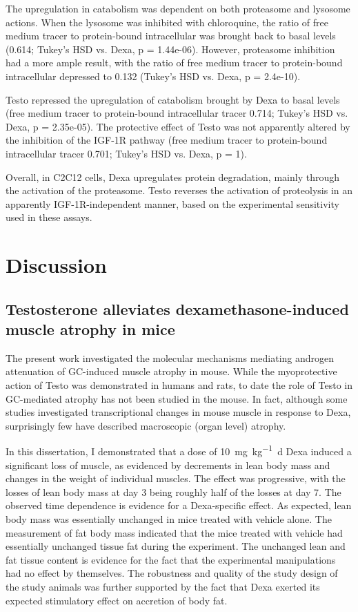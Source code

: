 \documentclass[12pt,english]{report}\usepackage[]{graphicx}\usepackage[]{color}
\begin{document}
The upregulation in catabolism was dependent on both proteasome and
lysosome actions. When the lysosome was inhibited with chloroquine,
the ratio of free medium tracer to protein-bound intracellular was
brought back to basal levels (0.614;
Tukey's HSD vs. Dexa, p = 1.44e-06).
However, proteasome inhibition had a more ample result, with the ratio
of free medium tracer to protein-bound intracellular depressed to
0.132
(Tukey's HSD vs. Dexa, p = 2.4e-10).

Testo repressed the upregulation of catabolism brought by Dexa to
basal levels (free medium tracer to protein-bound intracellular tracer
0.714;
Tukey's HSD vs. Dexa, p = 2.35e-05).
The protective effect of Testo was not apparently altered by the inhibition
of the IGF-1R pathway (free medium tracer to protein-bound intracellular
tracer 0.701;
Tukey's HSD vs. Dexa, p = 1).

Overall, in C2C12 cells, Dexa upregulates protein degradation, mainly
through the activation of the proteasome. Testo reverses the activation
of proteolysis in an apparently IGF-1R-independent manner, based on
the experimental sensitivity used in these assays.

\pagebreak{}


\chapter{Discussion}


\section{Testosterone alleviates dexamethasone-induced muscle atrophy in mice}

The present work investigated the molecular mechanisms mediating androgen
attenuation of GC-induced muscle atrophy in mouse. While the myoprotective
action of Testo was demonstrated in humans and rats, to date the role
of Testo in GC-mediated atrophy has not been studied in the mouse.
In fact, although some studies investigated transcriptional changes
in mouse muscle in response to Dexa, surprisingly few have described
macroscopic (organ level) atrophy.

In this dissertation, I demonstrated that a dose of \SI{10}{\milli\gram\per\kilo\gram\day}
Dexa induced a significant loss of muscle, as evidenced by decrements
in lean body mass and changes in the weight of individual muscles.
The effect was progressive, with the losses of lean body mass at day
3 being roughly half of the losses at day 7. The observed time dependence
is evidence for a Dexa-specific effect. As expected, lean body mass
was essentially unchanged in mice treated with vehicle alone. The
measurement of fat body mass indicated that the mice treated with
vehicle had essentially unchanged tissue fat during the experiment.
The unchanged lean and fat tissue content is evidence for the fact
that the experimental manipulations had no effect by themselves. The
robustness and quality of the study design of the study animals was
further supported by the fact that Dexa exerted its expected stimulatory
effect on accretion of body fat.
\end{document}
